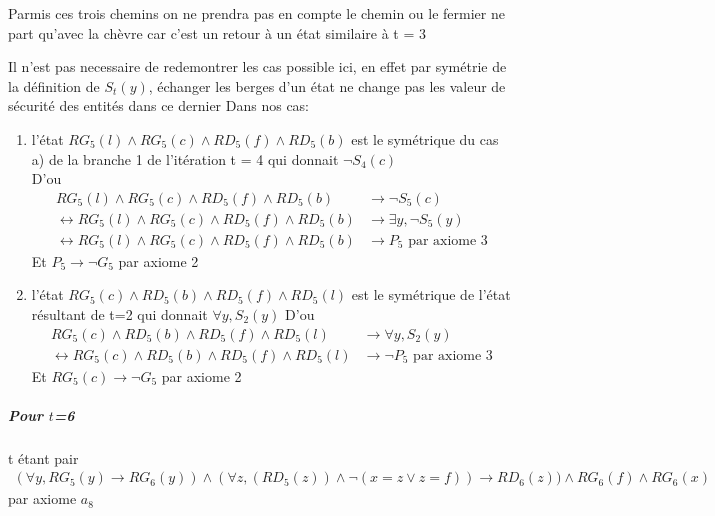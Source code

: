 \documentclass{article}
\begin{document}
\begin{enumerate}
Parmis ces trois chemins on ne prendra pas en compte le chemin ou le fermier ne part qu'avec la chèvre car c'est un retour à un état similaire à t = 3

Il n'est pas necessaire de redemontrer les cas possible ici, en effet par symétrie de la définition de $S_t(y)$, échanger les berges d'un état ne change pas les valeur de sécurité des entités dans ce dernier
Dans nos cas:
\begin{enumerate}
  \item  l'état $RG_5(l) \wedge RG_5(c) \wedge RD_5(f) \wedge RD_5(b)$ est le symétrique du cas a) de la branche 1 de l'itération t = 4 qui donnait $\neg S_4(c)$\\
  D'ou
  \begin{align*}
    RG_5(l) \wedge RG_5(c) \wedge RD_5(f) \wedge RD_5(b) &\to \neg S_5(c)\\
    \leftrightarrow RG_5(l) \wedge RG_5(c) \wedge RD_5(f) \wedge RD_5(b) &\to \exists y, \neg S_5(y)\\
    \leftrightarrow RG_5(l) \wedge RG_5(c) \wedge RD_5(f) \wedge RD_5(b) &\to P_5 \text{ par axiome 3}
  \end{align*}
  Et $P_5 \to \neg G_5$ par axiome 2
  \item  l'état $RG_5(c) \wedge RD_5(b) \wedge RD_5(f) \wedge RD_5(l)$ est le symétrique de l'état résultant de t=2 qui donnait $\forall y, S_2(y)$
  D'ou
  \begin{align*}
    RG_5(c) \wedge RD_5(b) \wedge RD_5(f) \wedge RD_5(l) &\to \forall y, S_2(y)\\
    \leftrightarrow RG_5(c) \wedge RD_5(b) \wedge RD_5(f) \wedge RD_5(l) &\to \neg P_5 \text{ par axiome 3}
  \end{align*}
  Et $RG_5(c) \to \neg G_5$ par axiome 2
\end{enumerate}
\end{enumerate}

\subparagraph*{Pour $t$=6}
t étant pair
\begin{align*}
    (\forall y, RG_{5}(y) \to RG_{6}(y)) \wedge (\forall z,(RD_{5}(z)) \wedge \neg(x=z \vee z=f)) \rightarrow RD_{6}(z)) \wedge RG_6(f) \wedge RG_6(x)
\end{align*} par axiome $a_8$\\
\end{document}
